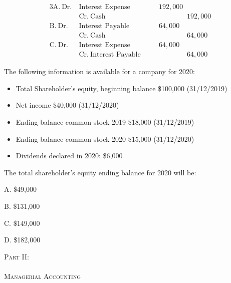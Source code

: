 \documentclass{scrartcl}
\begin{document}
\begin{alignat*}{3}
    \text{A.} ~ \text{Dr.} ~ & \text{Interest Expense} & \quad & 192,000 \\
                  & \text{Cr.} ~ \text{Cash} && \hspace{4em} 192,000 \\
    \text{B.} ~ \text{Dr.} ~ & \text{Interest Payable} & \quad & 64,000 \\
                  & \text{Cr.} ~ \text{Cash} && \hspace{4em} 64,000 \\
    \text{C.} ~ \text{Dr.} ~ & \text{Interest Expense} & \quad & 64,000 \\
                  & \text{Cr.} ~ \text{Interest Payable} && \hspace{4em} 64,000 
\end{alignat*}

\vspace{10em}

The following information is available for a company for 2020:
\begin{itemize}
    \item Total Shareholder's equity, beginning balance \$100,000 (31/12/2019)
    \item Net income \$40,000 (31/12/2020)
    \item Ending balance common stock 2019 \$18,000 (31/12/2019)
    \item Ending balance common stock 2020 \$15,000 (31/12/2020)
    \item Dividends declared in 2020: \$6,000
\end{itemize}

The total shareholder's equity ending balance for 2020 will be:

\bigskip

A. \$\phantom{0}49,000

B. \$131,000

C. \$149,000

D. \$182,000


\newpage

\thispagestyle{empty}

\clearpage
\vspace*{\fill}
\begin{center}
\begin{minipage}{\textwidth}
    \begin{center}
        {\Huge \scshape Part II: \\ \phantom{.} \\ Managerial Accounting}
    \end{center}
\end{minipage}
\end{center}
\vfill 
\clearpage
\vspace{10em}
\end{document}
